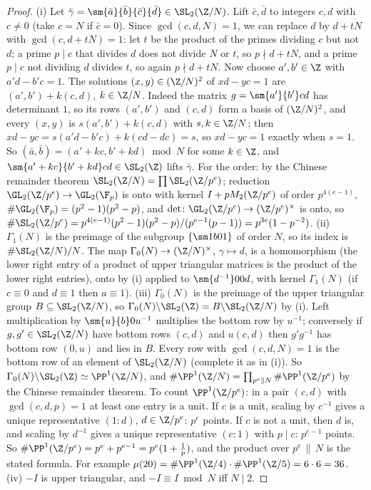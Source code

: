\begin{proof}
(i) Let $\bar\gamma=\sm{\bar a}{\bar b}{\bar c}{\bar d}\in\SL_2(\Z/N)$. Lift $\bar c,\bar d$ to integers $c,d$ with $c\ne0$ (take $c=N$ if $\bar c=0$). Since $\gcd(c,d,N)=1$, we can
replace $d$ by $d+tN$ with $\gcd(c,d+tN)=1$: let $t$ be the product of the primes dividing $c$ but not $d$; a prime $p\mid c$ that divides $d$ does not divide $N$
or $t$, so $p\nmid d+tN$, and a prime $p\mid c$ not dividing $d$ divides $t$, so again $p\nmid d+tN$. Now choose $a',b'\in\Z$ with $a'd-b'c=1$. The solutions
$(x,y)\in(\Z/N)^2$ of $xd-yc=1$ are $(a',b')+k(c,d)$, $k\in\Z/N$. Indeed the matrix $g=\sm{a'}{b'}cd$ has determinant $1$, so its rows $(a',b')$ and $(c,d)$ form a basis
of $(\Z/N)^2$, and every $(x,y)$ is $s(a',b')+k(c,d)$ with $s,k\in\Z/N$; then $xd-yc=s(a'd-b'c)+k(cd-dc)=s$, so $xd-yc=1$ exactly when $s=1$. So $(\bar a,\bar b)=(a'+kc,b'+kd)\bmod N$ for some $k\in\Z$, and $\sm{a'+kc}{b'+kd}cd\in\SL_2(\Z)$
lifts $\bar\gamma$. For the order: by the Chinese remainder theorem $\SL_2(\Z/N)=\prod\SL_2(\Z/p^e)$; reduction $\GL_2(\Z/p^e)\to\GL_2(\F_p)$ is onto with kernel
$I+pM_2(\Z/p^e)$ of order $p^{4(e-1)}$, $\#\GL_2(\F_p)=(p^2-1)(p^2-p)$, and $\det\colon\GL_2(\Z/p^e)\to(\Z/p^e)^\times$ is onto, so
$\#\SL_2(\Z/p^e)=p^{4(e-1)}(p^2-1)(p^2-p)/(p^{e-1}(p-1))=p^{3e}(1-p^{-2})$.
(ii) $\Gamma_1(N)$ is the preimage of the subgroup $\{\sm1b01\}$ of order $N$, so its index is $\#\SL_2(\Z/N)/N$. The map $\Gamma_0(N)\to(\Z/N)^\times$, $\gamma\mapsto d$, is a
homomorphism (the lower right entry of a product of upper triangular matrices is the product of the lower right entries), onto by (i) applied to
$\sm{d^{-1}}00d$, with kernel $\Gamma_1(N)$ (if $c\equiv0$ and $d\equiv1$ then $a\equiv1$).
(iii) $\Gamma_0(N)$ is the preimage of the upper triangular group $B\subseteq\SL_2(\Z/N)$, so $\Gamma_0(N)\backslash\SL_2(\Z)=B\backslash\SL_2(\Z/N)$ by (i). Left multiplication by
$\sm{u}{b}0{u^{-1}}$ multiplies the bottom row by $u^{-1}$; conversely if $g,g'\in\SL_2(\Z/N)$ have bottom rows $(c,d)$ and $u(c,d)$ then $g'g^{-1}$ has bottom row
$(0,u)$ and lies in $B$. Every row with $\gcd(c,d,N)=1$ is the bottom row of an element of $\SL_2(\Z/N)$ (complete it as in (i)). So
$\Gamma_0(N)\backslash\SL_2(\Z)\simeq\PP^1(\Z/N)$, and $\#\PP^1(\Z/N)=\prod_{p^e\|N}\#\PP^1(\Z/p^e)$ by the Chinese remainder theorem. To count $\PP^1(\Z/p^e)$: in a pair
$(c,d)$ with $\gcd(c,d,p)=1$ at least one entry is a unit. If $c$ is a unit, scaling by $c^{-1}$ gives a unique representative $(1:d)$, $d\in\Z/p^e$: $p^e$ points. If $c$ is not a
unit, then $d$ is, and scaling by $d^{-1}$ gives a unique representative $(c:1)$ with $p\mid c$: $p^{e-1}$ points. So $\#\PP^1(\Z/p^e)=p^e+p^{e-1}=p^e(1+\frac1p)$, and the product
over $p^e\,\|\,N$ is the stated formula. For example $\mu(20)=\#\PP^1(\Z/4)\cdot\#\PP^1(\Z/5)=6\cdot6=36$.
(iv) $-I$ is upper triangular, and $-I\equiv I\bmod N$ iff $N\mid2$.
\end{proof}

